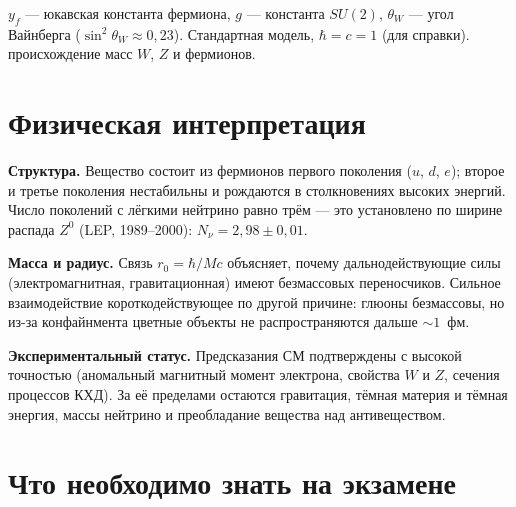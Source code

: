  {$y_f$ — юкавская константа фермиона, $g$ — константа $SU(2)$, $\theta_W$ — угол Вайнберга ($\sin^2\theta_W\approx0{,}23$).}
 {Стандартная модель, $\hbar=c=1$ (для справки).}
 {происхождение масс $W$, $Z$ и фермионов.}

\section{Физическая интерпретация}

\textbf{Структура.} Вещество состоит из фермионов первого поколения ($u$, $d$, $e$); второе и третье поколения
нестабильны и рождаются в столкновениях высоких энергий. Число поколений с лёгкими нейтрино равно трём — это
установлено по ширине распада $Z^0$ (LEP, 1989--2000): $N_\nu=2{,}98\pm0{,}01$.

\textbf{Масса и радиус.} Связь $r_0=\hbar/Mc$ объясняет, почему дальнодействующие силы (электромагнитная,
гравитационная) имеют безмассовых переносчиков. Сильное взаимодействие короткодействующее по другой причине:
глюоны безмассовы, но из-за конфайнмента цветные объекты не распространяются дальше $\sim1$~фм.

\textbf{Экспериментальный статус.} Предсказания СМ подтверждены с высокой точностью (аномальный магнитный момент
электрона, свойства $W$ и $Z$, сечения процессов КХД). За её пределами остаются гравитация, тёмная материя и
тёмная энергия, массы нейтрино и преобладание вещества над антивеществом.

\section{Что необходимо знать на экзамене}

